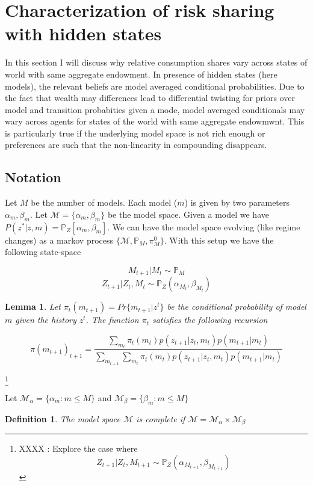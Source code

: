 \documentclass[12pt]{article}
\newtheorem{definition}{Definition}
\newtheorem*{lemma}{Lemma}
\begin{document}
\section{Characterization of risk sharing with hidden states}

In this section I will discuss why relative consumption shares vary across states of world with same aggregate endowment. In presence of hidden states (here models), the relevant beliefs are model averaged conditional probabilities. Due to the fact that wealth may differences lead to differential twisting for priors over model and transition probabities given a  mode, model averaged conditionals may wary across agents for states of the world with same aggregate endowmwnt. This is particularly true if the underlying model space is not rich enough or preferences are such that the non-linearity in compounding disappears.

\subsection{Notation}
Let $M$ be the number of models. Each model ($m$) is given by two parameters $\alpha_m,\beta_m$. Let $\mathcal{M}=\{\alpha_m,\beta_m\}$ be the model space. Given a model we have $P(z^*|z,m)=\mathbb{P}_{Z}[\alpha_m,\beta_m]$. We can have the model space evolving (like regime changes) as a markov process $\{\mathcal{M},\mathbb{P}_{M},\pi^0_{M}\}$. With this setup we have the following state-space

\[M_{t+1} | M_t \sim \mathbb{P}_{M}\]
\[Z_{t+1}|Z_t,M_t \sim \mathbb{P}_{Z}(\alpha_{M_t},\beta_{M_t})\]

\begin{lemma}
Let $\pi_{t}(m_{t+1})=Pr\{m_{t+1} | z^{t}\}$ be the conditional probability of model $m$ given the history $z^t$. The function $\pi_t$ satisfies the following recursion

\[\pi(m_{t+1})_{t+1}=\frac{\sum_{m_t}{\pi_{t}(m_t) p(z_{t+1}|z_t,m_t)p(m_{t+1}|m_t)}}{\sum_{m_{t+1}}{\sum_{m_t}{\pi_{t}(m_t) p(z_{t+1}|z_t,m_t)p(m_{t+1}|m_t)}}}\]
\end{lemma}


\footnote{XXXX : Explore the case where \[Z_{t+1}|Z_t,M_{t+1} \sim \mathbb{P}_{Z}(\alpha_{M_{t+1}},\beta_{M_{t+1}})\]}


Let $\mathcal{M}_{\alpha} = \{\alpha_m : m\leq M\}$ and  $\mathcal{M}_{\beta} = \{\beta_m : m\leq M\}$

\begin{definition}
The model space $\mathcal{M}$ is complete if $\mathcal{M}=\mathcal{M}_{\alpha} \times \mathcal{M}_{\beta}$
\end{definition}
\end{document}
